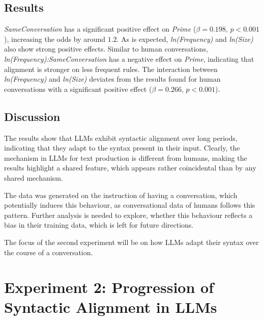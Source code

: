 \documentclass[11pt]{article}
\begin{document}
\subsection{Results}

\textit{SameConversation} has a significant positive effect on \textit{Prime} ($\beta=0.198,\, p<0.001$), increasing the odds by around $1.2$. As is expected, \textit{ln(Frequency)} and \textit{ln(Size)} also show strong positive effects.
Similar to human conversations, \textit{ln(Frequency):SameConversation} has a negative effect on \textit{Prime}, indicating that alignment is stronger on less frequent rules. The interaction between \textit{ln(Frequency)} and \textit{ln(Size)} deviates from the results found for human conversations with a significant positive effect ($\beta=0.266,\, p<0.001$).

\subsection{Discussion}


The results show that LLMs exhibit syntactic alignment over long periods, indicating that they adapt to the syntax present in their input.
Clearly, the mechanism in LLMs for text production is different from humans, making the results highlight a shared feature, which appears rather coincidental than by any shared mechanism.

The data was generated on the instruction of having a conversation, which potentially induces this behaviour, as conversational data of humans follows this pattern. Further analysis is needed to explore, whether this behaviour reflects a bias in their training data, which is left for future directions.

The focus of the second experiment will be on how LLMs adapt their syntax over the course of a conversation.

\section{Experiment 2: Progression of Syntactic Alignment in LLMs}
\end{document}
